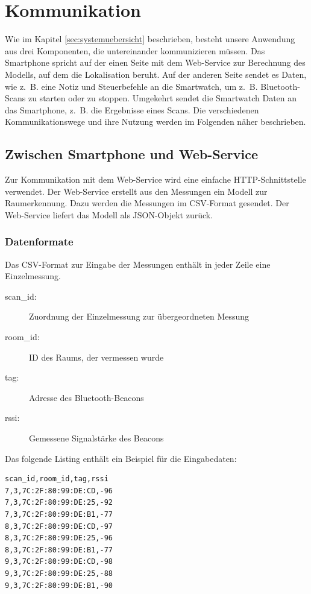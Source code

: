 \section{Kommunikation}
Wie im Kapitel \ref{sec:systemuebersicht} beschrieben, besteht unsere Anwendung aus drei Komponenten, die untereinander kommunizieren müssen. Das Smartphone spricht auf der einen Seite mit dem Web-Service zur Berechnung des Modells, auf dem die Lokalisation beruht. Auf der anderen Seite sendet es Daten, wie z.~B. eine Notiz und Steuerbefehle an die Smartwatch, um z.~B. Bluetooth-Scans zu starten oder zu stoppen. Umgekehrt sendet die Smartwatch Daten an das Smartphone, z.~B. die Ergebnisse eines Scans. Die verschiedenen Kommunikationswege und ihre Nutzung werden im Folgenden näher beschrieben.

\subsection{Zwischen Smartphone und Web-Service}

Zur Kommunikation mit dem Web-Service wird eine einfache HTTP-Schnittstelle verwendet.
Der Web-Service erstellt aus den Messungen ein Modell zur Raumerkennung. Dazu
werden die Messungen im CSV-Format gesendet. Der Web-Service liefert das Modell
als JSON-Objekt zurück.

\subsubsection{Datenformate}
\vspace{-1pt}
Das CSV-Format zur Eingabe der Messungen enthält in jeder Zeile eine Einzelmessung.
\begin{description}
	\item[scan\_id:] Zuordnung der Einzelmessung zur übergeordneten Messung
	\item[room\_id:] ID des Raums, der vermessen wurde
	\item[tag:] Adresse des Bluetooth-Beacons
	\item[rssi:] Gemessene Signalstärke des Beacons
\end{description}

Das folgende Listing enthält ein Beispiel für die Eingabedaten:
\begin{lstlisting}
scan_id,room_id,tag,rssi
7,3,7C:2F:80:99:DE:CD,-96
7,3,7C:2F:80:99:DE:25,-92
7,3,7C:2F:80:99:DE:B1,-77
8,3,7C:2F:80:99:DE:CD,-97
8,3,7C:2F:80:99:DE:25,-96
8,3,7C:2F:80:99:DE:B1,-77
9,3,7C:2F:80:99:DE:CD,-98
9,3,7C:2F:80:99:DE:25,-88
9,3,7C:2F:80:99:DE:B1,-90
\end{lstlisting}

